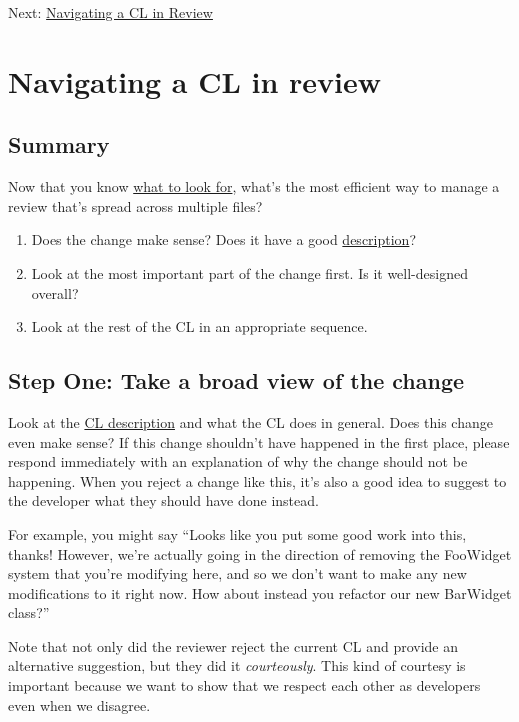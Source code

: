 \documentclass[
]{article}
\providecommand{\tightlist}{%
  \setlength{\itemsep}{0pt}\setlength{\parskip}{0pt}}
\begin{document}
Next: \href{navigate.md}{Navigating a CL in Review}

\section{Navigating a CL in review}\label{navigating-a-cl-in-review}

\subsection{Summary}\label{summary-2}

Now that you know \href{looking-for.md}{what to look for}, what's the
most efficient way to manage a review that's spread across multiple
files?

\begin{enumerate}
\def\labelenumi{\arabic{enumi}.}
\tightlist
\item
  Does the change make sense? Does it have a good
  \href{../developer/cl-descriptions.md}{description}?
\item
  Look at the most important part of the change first. Is it
  well-designed overall?
\item
  Look at the rest of the CL in an appropriate sequence.
\end{enumerate}

\subsection{Step One: Take a broad view of the change}\label{step_one}

Look at the \href{../developer/cl-descriptions.md}{CL description} and
what the CL does in general. Does this change even make sense? If this
change shouldn't have happened in the first place, please respond
immediately with an explanation of why the change should not be
happening. When you reject a change like this, it's also a good idea to
suggest to the developer what they should have done instead.

For example, you might say ``Looks like you put some good work into
this, thanks! However, we're actually going in the direction of removing
the FooWidget system that you're modifying here, and so we don't want to
make any new modifications to it right now. How about instead you
refactor our new BarWidget class?''

Note that not only did the reviewer reject the current CL and provide an
alternative suggestion, but they did it \emph{courteously}. This kind of
courtesy is important because we want to show that we respect each other
as developers even when we disagree.
\end{document}
